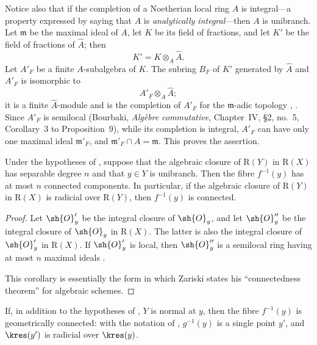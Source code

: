 Notice also that if the completion of a Noetherian local ring $A$ is
integral---a property expressed by saying that $A$ is
\emph{analytically integral}---then $A$ is unibranch.  Let
$\mathfrak{m}$ be the maximal ideal of $A$, let $K$ be its field of
fractions, and let $K'$ be the field of fractions of $\widehat{A}$;
then
\[
  K'=K\otimes_A\widehat{A}.
\]
Let $A'_F$ be a finite $A$-subalgebra of $K$.  The subring $B_F$ of
$K'$ generated by $\widehat{A}$ and $A'_F$ is isomorphic to
\[
  A'_F\otimes_A\widehat{A};
\]
it is a finite $\widehat{A}$-module and is the completion of $A'_F$
for the $\mathfrak{m}$-adic topology
, .  Since $A'_F$ is semilocal
(Bourbaki, \emph{Alg\`ebre commutative}, Chapter~IV, \S2, no.~5,
Corollary~3 to Proposition~9), while its completion is integral,
$A'_F$ can have only one maximal ideal $\mathfrak{m}'_F$, and
$\mathfrak{m}'_F\cap A=\mathfrak{m}$.  This proves the assertion.

\begin{corollary}[4.3.7]
\label{III.4.3.7}
Under the hypotheses of , suppose that the algebraic
closure of $\mathrm{R}(Y)$ in $\mathrm{R}(X)$ has separable degree $n$ and that
$y\in Y$ is unibranch.  Then the fibre $f^{-1}(y)$ has at most $n$
connected components.  In particular, if the algebraic closure of
$\mathrm{R}(Y)$ in $\mathrm{R}(X)$ is radicial over $\mathrm{R}(Y)$, then $f^{-1}(y)$ is
connected.
\end{corollary}

\begin{proof}
Let $\sh{O}'_y$ be the integral closure of $\sh{O}_y$, and let
$\sh{O}''_y$ be the integral closure of $\sh{O}_y$ in $\mathrm{R}(X)$.
The latter is also the integral closure of $\sh{O}'_y$ in $\mathrm{R}(X)$.
If $\sh{O}'_y$ is local, then $\sh{O}''_y$ is a semilocal ring
having at most $n$ maximal ideals
\cite[vol.~I, p.~289, Theorem~22]{I-13}.

This corollary is essentially the form in which Zariski states his
``connectedness theorem'' for algebraic schemes.
\end{proof}

\begin{remark}[4.3.8]
\label{III.4.3.8}
If, in addition to the hypotheses of , $Y$ is
normal at $y$, then the fibre $f^{-1}(y)$ is geometrically
connected: with the notation of , $g^{-1}(y)$ is a
single point $y'$, and $\kres(y')$ is radicial over $\kres(y)$.
\end{remark}

